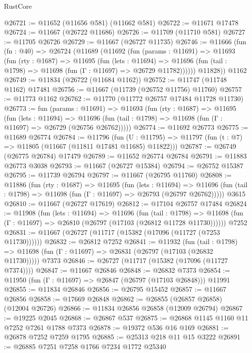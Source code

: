 \begin{lexlean}{RustCore}
\begin{coremodule}
@26721 := @11652 (@11656 @581) (@11662 @581)
@26722 := @11671 @17478
@26724 := @11667 (@26722 @11686)
@26726 := @11709 (@11710 @581)
@26727 := @11705 @26726
@26729 := @11667 (@26727 @11735)
@26746 := @11666
    (fun (fn : @40) =>
    @26724
      (@11689
        (@11692
          (fun (params : @11691) =>
          @11693
            (fun (rty : @1687) =>
            @11695
              (fun (lets : @11694) =>
              @11696 (fun (tail : @1798) => @11698 (fun (Γ : @11697) => @26729 @11782))))))
        @11828))
    @1162
@26749 := @11834 (@26722 (@11684 @1162))
@26752 := @11747 (@11748 @1162) @17481
@26756 := @11667 (@11739 (@26752 @11756) @11760)
@26757 := @11773 @1162
@26762 := @11770 (@11772 @26757 @17484 @11728 @11730)
@26773 := fun (params : @11691) =>
  @11693
    (fun (rty : @1687) =>
    @11695
      (fun (lets : @11694) =>
      @11696 (fun (tail : @1798) => @11698 (fun (Γ : @11697) => @26729 (@26756 @26762)))))
@26774 := @11692 @26773
@26775 := @11689 @26774
@26784 := @11796
    (fun (U : @11795) => @11797 (fun (t : @7) => @11805 (@11667 (@11811 @17481 @11685) @11822)))
@26787 := @26749 (@26775 @26784) @17479
@26789 := @11652 @26774 @26784
@26791 := @11883 @26773 @3038
@26793 := @11667 (@26727 @15384)
@26794 := @26752 @15387
@26795 := @11739 @26794
@26797 := @11667 (@26795 @11760)
@26808 := @11886
    (fun (rty : @1687) =>
    @11695
      (fun (lets : @11694) =>
      @11696 (fun (tail : @1798) => @11698 (fun (Γ : @11697) => @26793 (@26797 @26762)))))
    @3615
@26810 := @11667 (@26727 @17619)
@26812 := @17104 @26757 @17484
@26824 := @11908
    (fun (lets : @11694) =>
    @11696
      (fun (tail : @1798) =>
      @11698 (fun (Γ : @11697) => @26810 (@26797 (@17103 (@26812 @11728 @11730))))))
    @7252
@26831 := @11667 (@26727 (@11717 (@15382 (@17096 (@11727 (@7253 @11730))))))
@26832 := @26812 @7252
@26841 := @11932
    (fun (tail : @1798) => @11698 (fun (Γ : @11697) => @26831 (@26797 (@17103 (@26832 @11730)))))
    @7373
@26846 := @26727 (@11717 (@15382 (@17096 (@11727 @7374))))
@26847 := @11667 @26846
@26848 := @26832 @7373
@26854 := @11950 (fun (Γ : @11697) => @26847 (@26797 (@17103 @26848))) @11991
@26855 := @11834 @26846
@26856 := @26795 @15452
@26857 := @11667 @26856
@26858 := @17669 @26848
@26862 := @26855 (@26857 @26858) (@12004 @26726)
@26866 := @11834 @26856 @26858 (@12009 @26794)
@26867 := @19225 @2045
@26868 := @26867 @537
@26875 := @26868 @1145 @1160 @11 @7252 @7261 @1788 @7373
@26878 := @19372 @536 @16 @169
@26881 := @26878 @7252 @7259 @1795
@26885 := @25313 @218 @11 @15 @3222
@26891 := @26885 @7251 @7258 @1766 @7234 @1772 @25340

\end{coremodule}
\end{lexlean}
